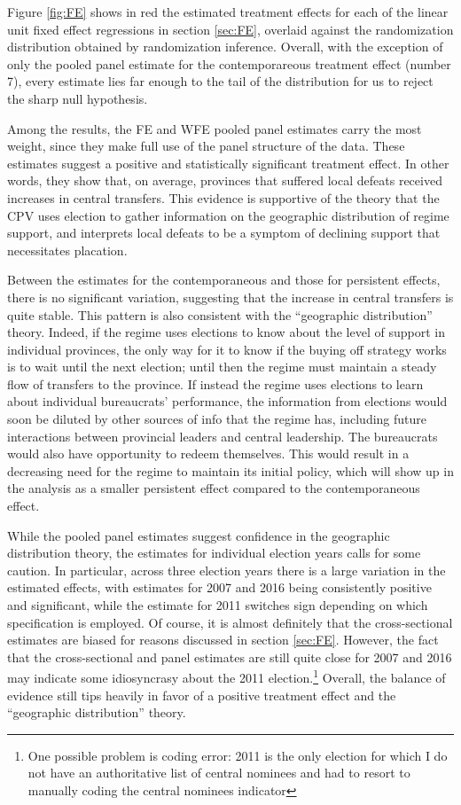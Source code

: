 \documentclass[12pt]{article}\usepackage[]{graphicx}\usepackage[]{color}
\newcommand{\1}{\mathbbm{1}}
\begin{document}
Figure \ref{fig:FE} shows in red the estimated treatment effects for each of the linear unit fixed effect regressions in section \ref{sec:FE}, overlaid against the randomization distribution obtained by randomization inference. Overall, with the exception of only the pooled panel estimate for the contemporareous treatment effect (number 7), every estimate lies far enough to the tail of the distribution for us to reject the sharp null hypothesis. 

Among the results, the FE and WFE pooled panel estimates carry the most weight, since they make full use of the panel structure of the data. These estimates suggest a positive and statistically significant treatment effect. In other words, they show that, on average, provinces that suffered local defeats received increases in central transfers. This evidence is supportive of the theory that the CPV uses election to gather information on the geographic distribution of regime support, and interprets local defeats to be a symptom of declining support that necessitates placation.

Between the estimates for the contemporaneous and those for persistent effects, there is no significant variation, suggesting that the increase in central transfers is quite stable. This pattern is also consistent with the ``geographic distribution'' theory. Indeed, if the regime uses elections to know about the level of support in individual provinces, the only way for it to know if the buying off strategy works is to wait until the next election; until then the regime must maintain a steady flow of transfers to the province.  If instead the regime uses elections to learn about individual bureaucrats' performance, the information from elections would soon be diluted by other sources of info that the regime has, including future interactions between provincial leaders and central leadership. The bureaucrats would also have opportunity to redeem themselves. This would result in a decreasing need for the regime to maintain its initial policy, which will show up in the analysis as a smaller persistent effect compared to the contemporaneous effect.

While the pooled panel estimates suggest confidence in the geographic distribution theory, the estimates for individual election years calls for some caution. In particular, across three election years there is a large variation in the estimated effects, with estimates for 2007 and 2016 being consistently positive and significant, while the estimate for 2011 switches sign depending on which specification is employed. Of course, it is almost definitely that the cross-sectional estimates are biased for reasons discussed in section \ref{sec:FE}. However, the fact that the cross-sectional and panel estimates are still quite close for 2007 and 2016 may indicate some idiosyncrasy about the 2011 election.\footnote{One possible problem is coding error: 2011 is the only election for which I do not have an authoritative list of central nominees and had to resort to manually coding the central nominees indicator} Overall, the balance of evidence still tips heavily in favor of a positive treatment effect and the ``geographic distribution'' theory.
\end{document}
